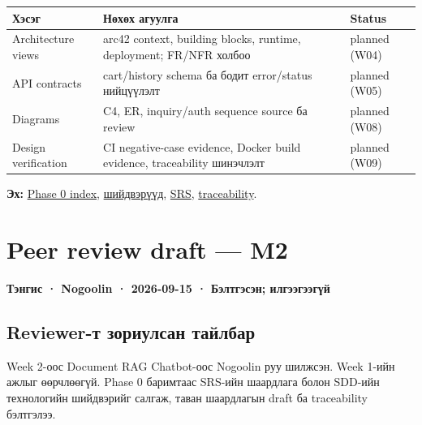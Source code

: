 \documentclass[
  11pt,
  a4paper,
]{article}
\begin{document}
\begin{longtable}[]{@{}
  >{\raggedright\arraybackslash}p{}
  >{\raggedright\arraybackslash}p{}
  >{\raggedright\arraybackslash}p{}@{}}
\toprule\noalign{}
\begin{minipage}[b]{\linewidth}\raggedright
Хэсэг
\end{minipage} & \begin{minipage}[b]{\linewidth}\raggedright
Нөхөх агуулга
\end{minipage} & \begin{minipage}[b]{\linewidth}\raggedright
Status
\end{minipage} \\
\midrule\noalign{}
\endhead
\bottomrule\noalign{}
\endlastfoot
Architecture views & arc42 context, building blocks, runtime,
deployment; FR/NFR холбоо & planned (W04) \\
API contracts & cart/history schema ба бодит error/status нийцүүлэлт &
planned (W05) \\
Diagrams & C4, ER, inquiry/auth sequence source ба review & planned
(W08) \\
Design verification & CI negative-case evidence, Docker build evidence,
traceability шинэчлэлт & planned (W09) \\
\end{longtable}

\textbf{Эх:} \href{../../phase-0/README.md}{Phase 0 index},
\href{../../../agent-context/DECISIONS.md}{шийдвэрүүд},
\href{../../requirements/srs-template.md}{SRS},
\href{../../requirements/traceability-matrix.md}{traceability}.

\clearpage
\section{Peer review draft --- M2}\label{doc7-peer-review-draft-m2}

\textbf{Тэнгис · Nogoolin · 2026-09-15 · Бэлтгэсэн; илгээгээгүй}

\subsection{Reviewer-т зориулсан
тайлбар}\label{doc7-reviewer-ux442-ux437ux43eux440ux438ux443ux43bux441ux430ux43d-ux442ux430ux439ux43bux431ux430ux440}

Week 2-оос Document RAG Chatbot-оос Nogoolin руу шилжсэн. Week 1-ийн
ажлыг өөрчлөөгүй. Phase 0 баримтаас SRS-ийн шаардлага болон SDD-ийн
технологийн шийдвэрийг салгаж, таван шаардлагын draft ба traceability
бэлтгэлээ.
\end{document}
